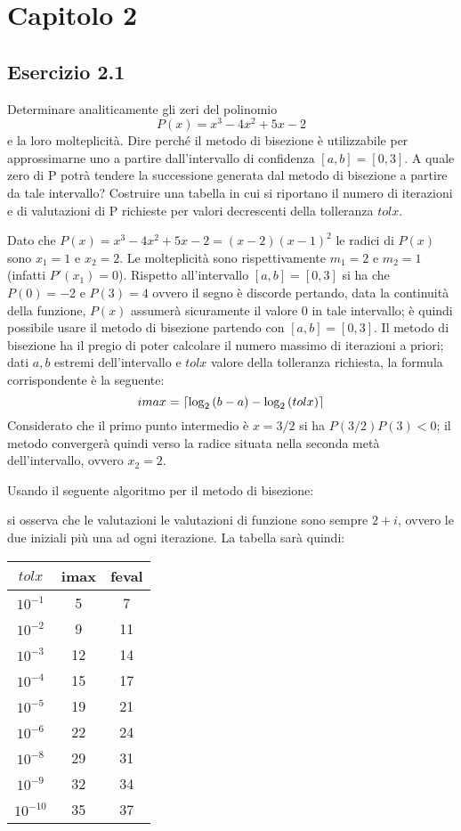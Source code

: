 \section{Capitolo 2}


	\subsection{Esercizio 2.1}

Determinare analiticamente gli zeri del polinomio 
\begin{equation*}
	P(x) = x^3 - 4x^2 + 5x - 2
\end{equation*}
 e la loro molteplicità. Dire perché il metodo di bisezione è utilizzabile per approssimarne uno a partire dall’intervallo di confidenza $[a,b]=[0,3]$. A quale zero di P potrà tendere la successione generata dal metodo di bisezione a partire da tale intervallo? Costruire una tabella in cui si riportano il numero di iterazioni e di valutazioni di P richieste per valori decrescenti della tolleranza $tolx$.

Dato che $P(x) = x^3 - 4x^2 + 5x - 2 = (x-2)(x-1)^2$ le radici di $P(x)$ sono $x_1=1$ e $x_2=2$. Le molteplicità sono rispettivamente $m_1=2$ e $m_2=1$ (infatti $P'(x_1) = 0$). Rispetto all'intervallo $[a,b]=[0,3]$ si ha che $P(0) = -2$ e $P(3)=4$ ovvero il segno è discorde pertando, data la continuità della funzione, $P(x)$ assumerà sicuramente il valore $0$ in tale intervallo; è quindi possibile usare il metodo di bisezione partendo con $[a,b] = [0,3].$
Il metodo di bisezione ha il pregio di poter calcolare il numero massimo di iterazioni a priori; dati $a,b$ estremi dell'intervallo e $tolx$ valore della tolleranza richiesta, la formula corrispondente è la seguente:
\begin{equation*}
	imax= \lceil\log_2{(b-a)}-\log_2{(tolx)}\rceil
\end{equation*}
Considerato che il primo punto intermedio è $x=3/2$ si ha $P(3/2)P(3)<0$; il metodo convergerà quindi verso la radice situata nella seconda metà dell'intervallo, ovvero $x_2=2$.

Usando il seguente algoritmo per il metodo di bisezione:

si osserva che le valutazioni le valutazioni di funzione sono sempre $2+i$, ovvero le due iniziali più una ad ogni iterazione. La tabella sarà quindi:

\begin{tabular}{ c | c | c }

$tolx$ & imax & feval \\
\hline
$10^{-1}$ & 5 & 7 \\
$10^{-2}$ & 9 & 11 \\
$10^{-3}$ & 12 & 14 \\
$10^{-4}$ & 15 & 17 \\
$10^{-5}$ & 19 & 21 \\
$10^{-6}$ & 22 & 24 \\
$10^{-8}$ & 29 & 31 \\
$10^{-9}$ & 32 & 34 \\
$10^{-10}$ & 35 & 37 \\

\end{tabular}


